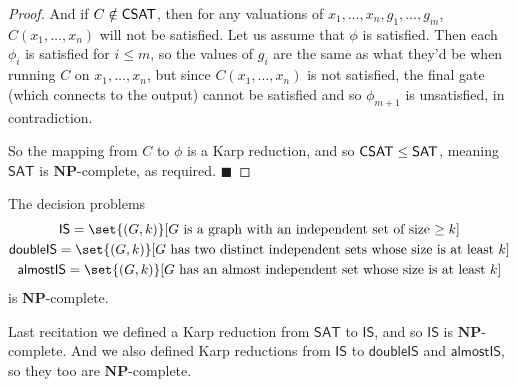 \documentclass[10pt]{article}
\def\sat{\textsf{SAT}}
\def\NP{\mathbf{NP}}
\def\qed{%
    \ifmmode%
        \eqno\blacksquare%
    \else%
        \hskip1cm\allowbreak\hbox{}\nobreak\hfill$\blacksquare$%
    \fi%
}
\begin{document}
\begin{proof}
    And if $C\notin\mathsf{CSAT}$, then for any valuations of $x_1,\dots,x_n,g_1,\dots,g_m$, $C(x_1,\dots,x_n)$ will not be satisfied.
    Let us assume that $\phi$ is satisfied.
    Then each $\phi_i$ is satisfied for $i\leq m$, so the values of $g_i$ are the same as what they'd be when running $C$ on $x_1,\dots,x_n$, but since $C(x_1,\dots,x_n)$ is not satisfied, the final gate
    (which connects to the output) cannot be satisfied and so $\phi_{m+1}$ is unsatisfied, in contradiction.

    So the mapping from $C$ to $\phi$ is a Karp reduction, and so $\csat\leq\sat$, meaning $\sat$ is $\NP$-complete, as required.
    \qed

\end{proof}

\def\is{\mathsf{IS}}
\def\dubis{\mathsf{doubleIS}}
\def\almostIS{\mathsf{almostIS}}
\begin{coro*}

    The decision problems
    \begin{gather*}
        \is = \set{(G,k)}[\text{$G$ is a graph with an independent set of size $\geq k$}] \\
        \dubis = \set{(G,k)}[\text{$G$ has two distinct independent sets whose size is at least $k$}] \\
        \almostIS = \set{(G,k)}[\text{$G$ has an almost independent set whose size is at least $k$}]
    \end{gather*}
    is $\NP$-complete.

\end{coro*}

Last recitation we defined a Karp reduction from $\sat$ to $\is$, and so $\is$ is $\NP$-complete.
And we also defined Karp reductions from $\is$ to $\dubis$ and $\almostIS$, so they too are $\NP$-complete.
\end{document}
